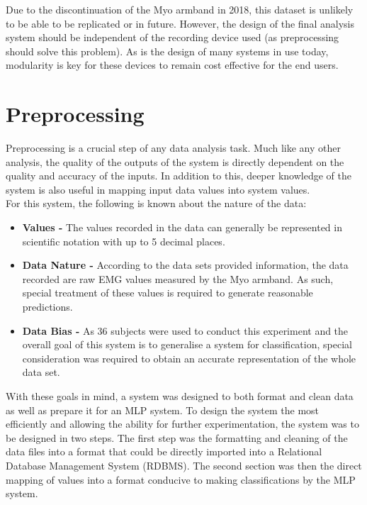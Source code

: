 \documentclass[11pt]{article}
\begin{document}
	\noindent
	Due to the discontinuation of the Myo armband in 2018, this dataset is unlikely to be able to be replicated or in future. However, the design of the final analysis system should be independent of the recording device used (as preprocessing should solve this problem). As is the design of many systems in use today, modularity is key for these devices to remain cost effective for the end users. 
	
	\section{Preprocessing}
	Preprocessing is a crucial step of any data analysis task. Much like any other analysis, the quality of the outputs of the system is directly dependent on the quality and accuracy of the inputs. In addition to this, deeper knowledge of the system is also useful in mapping input data values into system values.\\
	
	\noindent
	For this system, the following is known about the nature of the data:
	
	\begin{itemize}
		\item \textbf{Values - } The values recorded in the data can generally be represented in scientific notation with up to 5 decimal places. 
		\item \textbf{Data Nature - } According to the data sets provided information\cite{Lobov2018}, the data recorded are raw EMG values measured by the Myo armband. As such, special treatment of these values is required to  generate reasonable predictions.
		\item \textbf{Data Bias - } As 36 subjects were used to conduct this experiment and the overall goal of this system is to generalise a system for classification, special consideration was required to obtain an accurate representation of the whole data set.
	\end{itemize}

	\noindent
	With these goals in mind, a system was designed to both format and clean data as well as prepare it for an MLP system. To design the system the most efficiently and allowing the ability for further experimentation, the system was to be designed in two steps. The first step was the formatting and cleaning of the data files into a format that could be directly imported into a Relational Database Management System (RDBMS). The second section was then the direct mapping of values into a format conducive to making classifications by the MLP system. 
	
\end{document}
